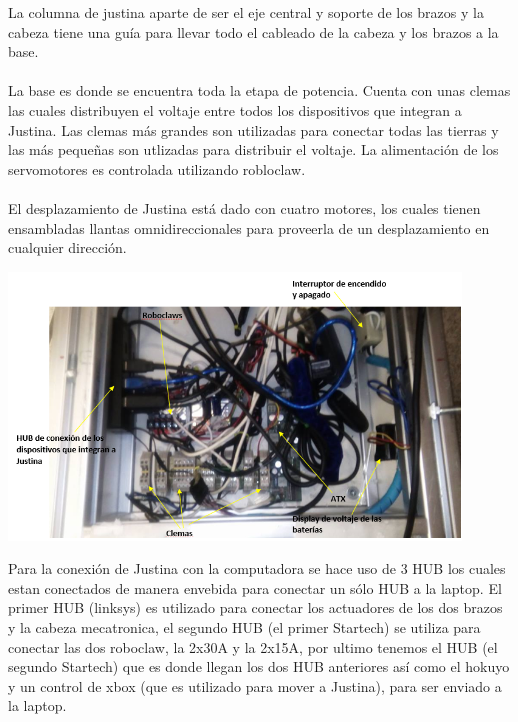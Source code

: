 \documentclass[a4paper]{book}
\begin{document}
La columna de justina aparte de ser el eje central y soporte de los brazos y la cabeza tiene una guía para llevar todo el
cableado de la cabeza y los brazos a la base.\\
\\
La base es donde se encuentra toda la etapa de potencia. Cuenta con unas clemas las cuales distribuyen el voltaje entre 
todos los dispositivos que integran a Justina. Las clemas más grandes son utilizadas para conectar todas las tierras y las
más pequeñas son utlizadas para distribuir el voltaje. La alimentación de los servomotores es controlada utilizando 
robloclaw.\\
\\

El desplazamiento de Justina está dado con cuatro motores, los cuales tienen ensambladas llantas omnidireccionales
para proveerla de un desplazamiento en cualquier dirección.

\begin{center}
\includegraphics[width=0.9\textwidth]{Figures/Hardware/Diagramas/Base.png}
\label{fig:Hardware:Diagramas:Justina:Base}
\end{center}

Para la conexión de Justina con la computadora se hace uso de 3 HUB los cuales estan conectados de manera envebida para conectar
un sólo HUB a la laptop. El primer HUB (linksys) es utilizado para conectar los actuadores de los dos brazos y la cabeza mecatronica,
el segundo HUB (el primer Startech) se utiliza para conectar las dos roboclaw, la 2x30A y la 2x15A, por ultimo tenemos el HUB (el segundo 
Startech) que es donde llegan los dos HUB anteriores así como el hokuyo y un control de xbox (que es utilizado para mover a Justina), para
ser enviado a la laptop.\\
\\
\end{document}
